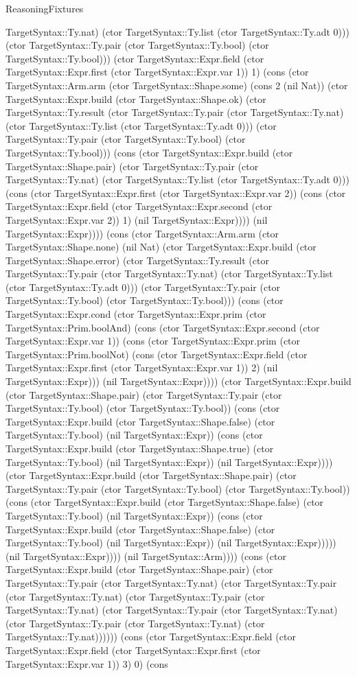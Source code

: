 \begin{lexlean}{ReasoningFixtures}
\begin{semanticmodule}
{TargetSyntax::Ty.nat) (ctor TargetSyntax::Ty.list (ctor TargetSyntax::Ty.adt 0))) (ctor TargetSyntax::Ty.pair (ctor TargetSyntax::Ty.bool) (ctor TargetSyntax::Ty.bool))) (ctor TargetSyntax::Expr.field (ctor TargetSyntax::Expr.first (ctor TargetSyntax::Expr.var 1)) 1) (cons (ctor TargetSyntax::Arm.arm (ctor TargetSyntax::Shape.some) (cons 2 (nil Nat)) (ctor TargetSyntax::Expr.build (ctor TargetSyntax::Shape.ok) (ctor TargetSyntax::Ty.result (ctor TargetSyntax::Ty.pair (ctor TargetSyntax::Ty.nat) (ctor TargetSyntax::Ty.list (ctor TargetSyntax::Ty.adt 0))) (ctor TargetSyntax::Ty.pair (ctor TargetSyntax::Ty.bool) (ctor TargetSyntax::Ty.bool))) (cons (ctor TargetSyntax::Expr.build (ctor TargetSyntax::Shape.pair) (ctor TargetSyntax::Ty.pair (ctor TargetSyntax::Ty.nat) (ctor TargetSyntax::Ty.list (ctor TargetSyntax::Ty.adt 0))) (cons (ctor TargetSyntax::Expr.first (ctor TargetSyntax::Expr.var 2)) (cons (ctor TargetSyntax::Expr.field (ctor TargetSyntax::Expr.second (ctor TargetSyntax::Expr.var 2)) 1) (nil TargetSyntax::Expr)))) (nil TargetSyntax::Expr)))) (cons (ctor TargetSyntax::Arm.arm (ctor TargetSyntax::Shape.none) (nil Nat) (ctor TargetSyntax::Expr.build (ctor TargetSyntax::Shape.error) (ctor TargetSyntax::Ty.result (ctor TargetSyntax::Ty.pair (ctor TargetSyntax::Ty.nat) (ctor TargetSyntax::Ty.list (ctor TargetSyntax::Ty.adt 0))) (ctor TargetSyntax::Ty.pair (ctor TargetSyntax::Ty.bool) (ctor TargetSyntax::Ty.bool))) (cons (ctor TargetSyntax::Expr.cond (ctor TargetSyntax::Expr.prim (ctor TargetSyntax::Prim.boolAnd) (cons (ctor TargetSyntax::Expr.second (ctor TargetSyntax::Expr.var 1)) (cons (ctor TargetSyntax::Expr.prim (ctor TargetSyntax::Prim.boolNot) (cons (ctor TargetSyntax::Expr.field (ctor TargetSyntax::Expr.first (ctor TargetSyntax::Expr.var 1)) 2) (nil TargetSyntax::Expr))) (nil TargetSyntax::Expr)))) (ctor TargetSyntax::Expr.build (ctor TargetSyntax::Shape.pair) (ctor TargetSyntax::Ty.pair (ctor TargetSyntax::Ty.bool) (ctor TargetSyntax::Ty.bool)) (cons (ctor TargetSyntax::Expr.build (ctor TargetSyntax::Shape.false) (ctor TargetSyntax::Ty.bool) (nil TargetSyntax::Expr)) (cons (ctor TargetSyntax::Expr.build (ctor TargetSyntax::Shape.true) (ctor TargetSyntax::Ty.bool) (nil TargetSyntax::Expr)) (nil TargetSyntax::Expr)))) (ctor TargetSyntax::Expr.build (ctor TargetSyntax::Shape.pair) (ctor TargetSyntax::Ty.pair (ctor TargetSyntax::Ty.bool) (ctor TargetSyntax::Ty.bool)) (cons (ctor TargetSyntax::Expr.build (ctor TargetSyntax::Shape.false) (ctor TargetSyntax::Ty.bool) (nil TargetSyntax::Expr)) (cons (ctor TargetSyntax::Expr.build (ctor TargetSyntax::Shape.false) (ctor TargetSyntax::Ty.bool) (nil TargetSyntax::Expr)) (nil TargetSyntax::Expr))))) (nil TargetSyntax::Expr)))) (nil TargetSyntax::Arm)))) (cons (ctor TargetSyntax::Expr.build (ctor TargetSyntax::Shape.pair) (ctor TargetSyntax::Ty.pair (ctor TargetSyntax::Ty.nat) (ctor TargetSyntax::Ty.pair (ctor TargetSyntax::Ty.nat) (ctor TargetSyntax::Ty.pair (ctor TargetSyntax::Ty.nat) (ctor TargetSyntax::Ty.pair (ctor TargetSyntax::Ty.nat) (ctor TargetSyntax::Ty.pair (ctor TargetSyntax::Ty.nat) (ctor TargetSyntax::Ty.nat)))))) (cons (ctor TargetSyntax::Expr.field (ctor TargetSyntax::Expr.field (ctor TargetSyntax::Expr.first (ctor TargetSyntax::Expr.var 1)) 3) 0) (cons }
\end{semanticmodule}
\end{lexlean}
